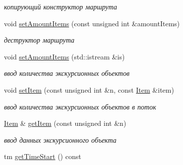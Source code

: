 \begin{DoxyCompactItemize}
\begin{DoxyCompactList}\small\item\em копирующий конструктор маршрута \end{DoxyCompactList}\item 
\hypertarget{class_route_ada2034f9fafbe545ee52cd508c2857c3}{}void \hyperlink{class_route_ada2034f9fafbe545ee52cd508c2857c3}{set\+Amount\+Items} (const unsigned int \&amount\+Items)\label{class_route_ada2034f9fafbe545ee52cd508c2857c3}

\begin{DoxyCompactList}\small\item\em деструктор маршрута \end{DoxyCompactList}\item 
\hypertarget{class_route_af4c2579eea10597f0f13d4fd3857b97f}{}void \hyperlink{class_route_af4c2579eea10597f0f13d4fd3857b97f}{set\+Amount\+Items} (std\+::istream \&is)\label{class_route_af4c2579eea10597f0f13d4fd3857b97f}

\begin{DoxyCompactList}\small\item\em ввод количества экскурсионных объектов \end{DoxyCompactList}\item 
\hypertarget{class_route_a9902364fc0bc42d74903895d6f69aacf}{}void \hyperlink{class_route_a9902364fc0bc42d74903895d6f69aacf}{set\+Item} (const unsigned int \&n, const \hyperlink{class_item}{Item} \&item)\label{class_route_a9902364fc0bc42d74903895d6f69aacf}

\begin{DoxyCompactList}\small\item\em ввод количества экскурсионных объектов в поток \end{DoxyCompactList}\item 
\hypertarget{class_route_af01e53eee5dee6ef8285ac651d39b379}{}\hyperlink{class_item}{Item} \& \hyperlink{class_route_af01e53eee5dee6ef8285ac651d39b379}{get\+Item} (const unsigned int \&n)\label{class_route_af01e53eee5dee6ef8285ac651d39b379}

\begin{DoxyCompactList}\small\item\em ввод данных экскурсионного объекта \end{DoxyCompactList}\item 
\hypertarget{class_route_a99bd00c3c6e2f1307a0375e85649c181}{}tm \hyperlink{class_route_a99bd00c3c6e2f1307a0375e85649c181}{get\+Time\+Start} () const \label{class_route_a99bd00c3c6e2f1307a0375e85649c181}


\end{DoxyCompactItemize}
